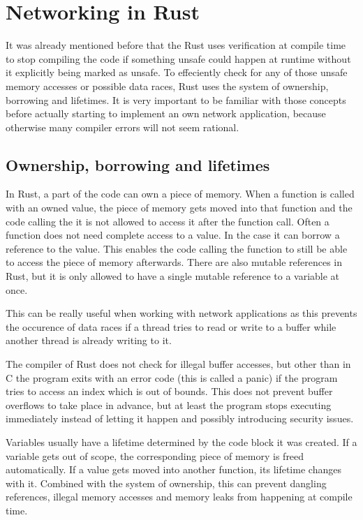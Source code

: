 
\section{Networking in Rust}
It was already mentioned before that the Rust uses verification at compile time to stop compiling the code if
something unsafe could happen at runtime without it explicitly being marked as unsafe. To effeciently check for any of
those unsafe memory accesses or possible data races, Rust uses the system of ownership, borrowing and lifetimes. It is
very important to be familiar with those concepts before actually starting to implement an own network application,
because otherwise many compiler errors will not seem rational.

\subsection{Ownership, borrowing and lifetimes}
In Rust, a part of the code can own a piece of memory. When a function is called with an owned value, the piece of
memory gets moved into that function and the code calling the it is not allowed to access it after the function call.
Often a function does not need complete access to a value. In the case it can borrow a reference to the value. This
enables the code calling the function to still be able to access the piece of memory afterwards. There are also mutable
references in Rust, but it is only allowed to have a single mutable reference to a variable at once.

This can be really useful when working with network applications as this prevents the occurence of data races if a
thread tries to read or write to a buffer while another thread is already writing to it.

The compiler of Rust does not check for illegal buffer accesses, but other than in C the program exits with an error
code (this is called a panic) if the program tries to access an index which is out of bounds. This does not prevent
buffer overflows to take place in advance, but at least the program stops executing immediately instead of letting it
happen and possibly introducing security issues.

Variables usually have a lifetime determined by the code block it was created. If a variable gets out of scope, the
corresponding piece of memory is freed automatically. If a value gets moved into another function, its lifetime changes
with it. Combined with the system of ownership, this can prevent dangling references, illegal memory accesses and
memory leaks from happening at compile time. \cite{c15safe}


